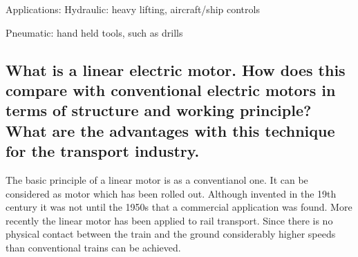 \documentclass[10pt,a4paper]{article}
\begin{document}
Applications:
Hydraulic: heavy lifting, aircraft/ship controls

Pneumatic: hand held tools, such as drills


\subsection{What is a linear electric motor. How does this compare with conventional electric motors in terms of structure and
working principle? What are the advantages with this technique for the transport industry.}

The basic principle of a linear motor is as a conventianol one. It can be considered as motor which has been rolled out.
Although invented in the 19th century it was not until the 1950s that a
commercial application was found. More recently the linear motor has been applied to rail transport. Since there is no physical contact between the train and the ground considerably higher speeds than conventional trains can be achieved.
\end{document}
